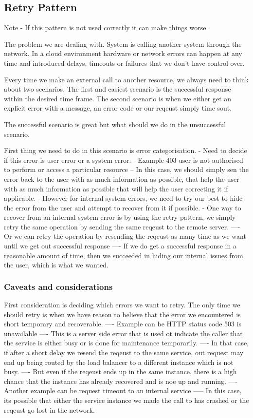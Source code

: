 \documentclass[a4paper, 11pt]{book}
\begin{document}
    \subsection{Retry Pattern}
    Note - If this pattern is not used correctly it can make things worse.

    The problem we are dealing with.
    System is calling another system through the network.
    In a cloud environment hardware or network errors can happen at any time and introduced delays, timeouts or failures that we don't have control over.

    Every time we make an external call to another resource, we always need to think about two scenarios.
    The first and easiest scenario is the successful response within the desired time frame.
    The second scenario is when we either get an explicit error with a message, an error code or our reqeust simply time sout.

    The successful scenario is great but what should we do in the unsuccessful scenario.

    First thing we need to do in this scenario is error categorisation.
    - Need to decide if this error is user error or a system error.
    - Example 403 user is not authorised to perform or access a particular resource
    -- In this case, we should simply sen the error back to the user with as much information as possible, that help the user with as much information as possible that will help the user correcting it if applicable.
    - However for internal system errors, we need to try our best to hide the error from the user and attempt to recover from it if possible.
    - One way to recover from an internal system error is by using the retry pattern, we simply retry the same operation by sending the same reqeust to the remote server.
    ---- Or we can retry the operation by resending the reqeust as many time as we want until we get out successful response
    ---- If we do get a successful response in a reasonable amount of time, then we succeeded in hiding our internal issues from the user, which is what we wanted.

    \subsubsection{Caveats and considerations}
    First consideration is deciding which errors we want to retry.
    The only time we should retry is when we have reason to believe that the error we encountered is short temporary and recoverable.
    ---- Example can be HTTP status code 503 is unavailable
    ---- This is a server side error that is used ot indicate the caller that the service is either busy or is done for maintenance temporarily.
    ---- In that case, if after a short delay we resend the reqeust to the same service, out request may end up being routed by the load balancer to a different instance which is not busy.
    ---- But even if the reqeust ends up in the same instance, there is a high chance that the instance has already recovered and is noe up and running.
    ---- Another example can be request timeout to an internal service
    ----- In this case, its possible that either the service instance we made the call to has crashed or the reqeust go lost in the network.
\end{document}
